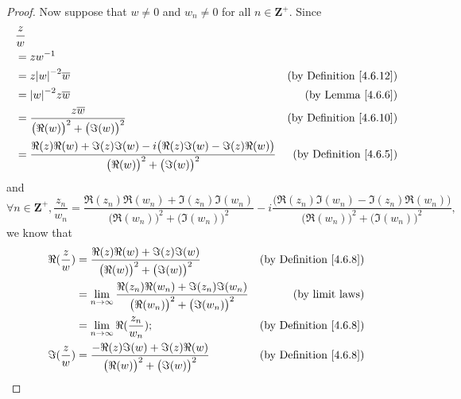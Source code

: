 \begin{proof}
    Now suppose that \(w \neq 0\) and \(w_n \neq 0\) for all \(n \in \mathbf{Z}^+\).
    Since
    \begin{align*}
         & \frac{z}{w}                                                                                                                                                       \\
         & = z w^{-1}                                                                                                                                                        \\
         & = z \abs*{w}^{-2} \overline{w}                                                                                              & \text{(by Definition \ref{4.6.12})} \\
         & = \abs*{w}^{-2} z \overline{w}                                                                                              & \text{(by Lemma \ref{4.6.6})}       \\
         & = \frac{z \overline{w}}{\big(\Re(w)\big)^2 + \big(\Im(w)\big)^2}                                                            & \text{(by Definition \ref{4.6.10})} \\
         & = \frac{\Re(z) \Re(w) + \Im(z) \Im(w) - i \big(\Re(z) \Im(w) - \Im(z) \Re(w)\big)}{\big(\Re(w)\big)^2 + \big(\Im(w)\big)^2} & \text{(by Definition \ref{4.6.5})}
    \end{align*}
    and
    \[
        \forall n \in \mathbf{Z}^+, \frac{z_n}{w_n} = \frac{\Re(z_n) \Re(w_n) + \Im(z_n) \Im(w_n)}{\big(\Re(w_n)\big)^2 + \big(\Im(w_n)\big)^2} - i \frac{\big(\Re(z_n) \Im(w_n) - \Im(z_n) \Re(w_n)\big)}{\big(\Re(w_n)\big)^2 + \big(\Im(w_n)\big)^2},
    \]
    we know that
    \begin{align*}
        \Re(\frac{z}{w}) & = \frac{\Re(z) \Re(w) + \Im(z) \Im(w)}{\big(\Re(w)\big)^2 + \big(\Im(w)\big)^2}                                   & \text{(by Definition \ref{4.6.8})} \\
                         & = \lim_{n \to \infty} \frac{\Re(z_n) \Re(w_n) + \Im(z_n) \Im(w_n)}{\big(\Re(w_n)\big)^2 + \big(\Im(w_n)\big)^2}   & \text{(by limit laws)}             \\
                         & = \lim_{n \to \infty} \Re(\frac{z_n}{w_n});                                                                       & \text{(by Definition \ref{4.6.8})} \\
        \Im(\frac{z}{w}) & = \frac{- \Re(z) \Im(w) + \Im(z) \Re(w)}{\big(\Re(w)\big)^2 + \big(\Im(w)\big)^2}                                 & \text{(by Definition \ref{4.6.8})} \\

\end{align*}
\end{proof}
